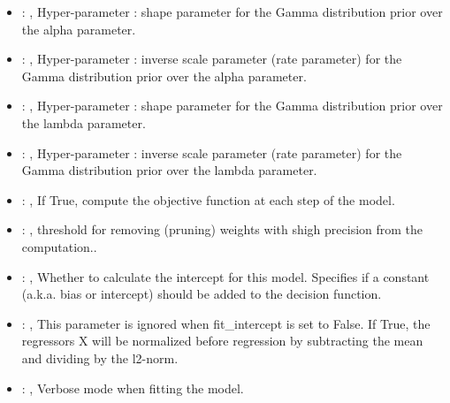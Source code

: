 \begin{itemize}
    \item {}: , 
      Hyper-parameter : shape parameter for the Gamma
      distribution prior over the alpha parameter.

    \item {}: , 
      Hyper-parameter : inverse scale parameter (rate parameter)
      for the Gamma distribution prior over the alpha parameter.

    \item {}: , 
      Hyper-parameter : shape parameter for the Gamma distribution
      prior over the lambda parameter.

    \item {}: , 
      Hyper-parameter : inverse scale parameter (rate parameter) for
      the Gamma distribution prior over the lambda parameter.

    \item {}: , 
      If True, compute the objective function at each step of the
      model.

    \item {}: , 
      threshold for removing (pruning) weights with
      shigh precision from the computation..

    \item {}: , 
      Whether to calculate the intercept for this model. Specifies if a constant (a.k.a. bias or
      intercept)                                                   should be added to the decision
      function.

    \item {}: , 
      This parameter is ignored when fit\_intercept is set to False. If True,
      the regressors X will be normalized before regression by subtracting the mean and
      dividing by the l2-norm.

    \item {}: , 
      Verbose mode when fitting the model.
  \end{itemize}


